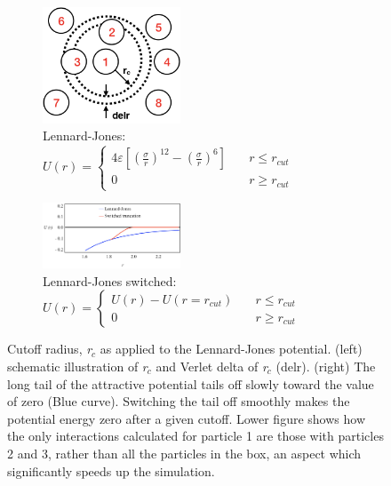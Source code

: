 \documentclass{scrbook}
\begin{document}
\begin{figure}
	\centering
	\begin{subfigure}{0.4\textwidth} %
    \includegraphics[width=0.45\textwidth]{gfx/image41.png}
    \caption{
    Lennard-Jones:
    $U\left(r\right)=\left\{ \begin{array}{cc}
    4\varepsilon\left[\left(\frac{\sigma}{r}\right)^{12}-\left(\frac{\sigma}{r}\right)^{6}\right] & \quad r\leq r_{cut}\\
    0 & \quad r\geq r_{cut}
    \end{array}\right.$
    }
	\end{subfigure}
	\begin{subfigure}{0.4\textwidth} %
    \includegraphics[width=0.45\textwidth]{gfx/image42.png}
    \caption{
    Lennard-Jones switched:
    $U\left(r\right)=\left\{ \begin{array}{cc}
    U\left(r\right)-U\left(r=r_{cut}\right) & \quad r\leq r_{cut}\\
    0 & \quad r\geq r_{cut}
    \end{array}\right.$
    }
	\end{subfigure}
  \caption{Cutoff radius, \textit{r}$_{c}$ as applied to the Lennard-Jones
potential. (left) schematic illustration of \textit{r}$_{c}$ and Verlet delta
of \textit{r}$_{c}$ (delr). (right) The long tail of the attractive potential
tails off slowly toward the value of zero (Blue curve). Switching the tail off
smoothly makes the potential energy zero after a given cutoff. Lower figure
shows how the only interactions calculated for particle 1 are those with
particles 2 and 3, rather than all the particles in the box, an aspect which
significantly speeds up the simulation. }
\label{fig:10}
\end{figure}
\end{document}
